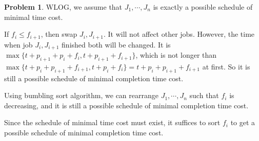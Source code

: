 \documentclass[a4paper]{article}
\theoremstyle{definition}
\newtheorem{problem}{Problem}
\theoremstyle{plain}
\numberwithin{equation}{problem}
\begin{document}
\begin{problem}
  WLOG, we assume that  $ J_1,\cdots,J_n $  is exactly a possible schedule of minimal time cost.

  If  $ f_i  \leq  f_{i+1} $, then swap  $ J_i,J_{i+1} $. It will not affect other jobs. However, the time when job $ J_i,J_{i+1} $ finished both will be changed. It is   $ \max\{t+p_{i+1}+p_{i}+f_i,t+p_{i+1}+f_{i+1}\} $, which is not longer than  $ \max\{t+p_i+p_{i+1}+f_{i+1},t+p_i+f_i\}=t+p_i+p_{i+1}+f_{i+1} $ at first. So it is still  a possible schedule of minimal completion  time cost.
  
  Using bumbling sort algorithm, we can  rearrange  $ J_1,\cdots,J_n $ such that  $ f_i $ is decreasing, and it is still a possible schedule of minimal completion time cost.

  Since the schedule of minimal time cost must exist, it suffices to sort  $ f_i $ to get a possible schedule of minimal completion time cost. 
\end{problem}
\end{document}
